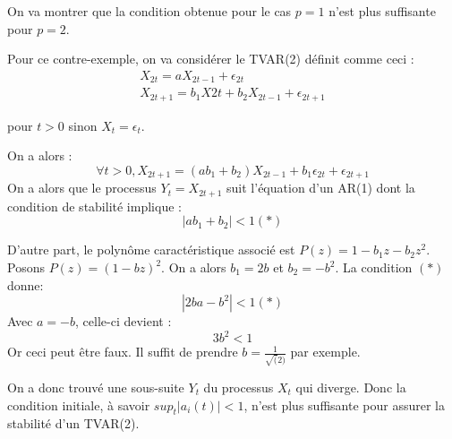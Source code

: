 \documentclass[a4paper,french]{article}
\begin{document}
On va montrer que la condition obtenue pour le cas $p=1$ n'est plus suffisante pour $p=2$.

Pour ce contre-exemple, on va considérer le TVAR(2) définit comme ceci :
\begin{align*}
X_{2t} = a X_{2t-1} + \epsilon_{2t} \\
X_{2t+1} = b_1 X{2t} + b_2 X_{2t-1} + \epsilon_{2t+1}
\end{align*}

pour $t>0$ sinon $X_t = \epsilon_t$.

On a alors :
\begin{equation}
\forall t>0, X_{2t+1} = (ab_1 + b_2) X_{2t-1} + b_1 \epsilon_{2t} + \epsilon_{2t+1}
\end{equation}
On a alors que le processus $Y_t = X_{2t+1}$ suit l'équation d'un AR(1) dont la condition de stabilité implique :
\begin{equation}
|ab_1 + b_2| < 1 (*)
\end{equation}

D'autre part, le polynôme caractéristique associé est $P(z) = 1 - b_1 z - b_2 z^2$. Posons $P(z) = (1-bz)^2$. On a alors $b_1 = 2b$ et $b_2 = -b^2$.
La condition $(*)$ donne:
\begin{equation}
|2ba-b^2| <1 (*)
\end{equation}
Avec $a = -b$, celle-ci devient :
\begin{equation}
3b^2 < 1
\end{equation}
Or ceci peut être faux. Il suffit de prendre $b=\frac{1}{\sqrt(2)}$ par exemple.

On a donc trouvé une sous-suite $Y_t$ du processus $X_t$ qui diverge. Donc la condition initiale, à savoir $sup_t|a_i(t)|<1$, n'est plus suffisante pour assurer la stabilité d'un TVAR(2).
\end{document}
